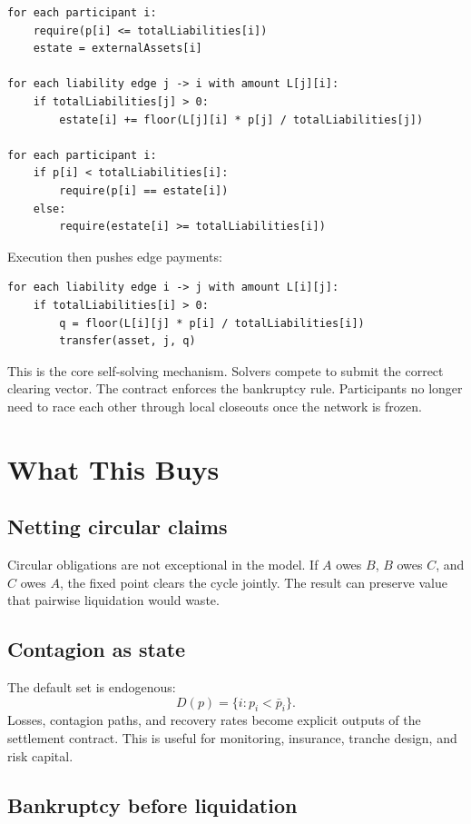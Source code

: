 \documentclass[11pt,oneside]{article}
\newcommand{\barp}{\bar p}
\begin{document}
\begin{verbatim}
for each participant i:
    require(p[i] <= totalLiabilities[i])
    estate = externalAssets[i]

for each liability edge j -> i with amount L[j][i]:
    if totalLiabilities[j] > 0:
        estate[i] += floor(L[j][i] * p[j] / totalLiabilities[j])

for each participant i:
    if p[i] < totalLiabilities[i]:
        require(p[i] == estate[i])
    else:
        require(estate[i] >= totalLiabilities[i])
\end{verbatim}

Execution then pushes edge payments:

\begin{verbatim}
for each liability edge i -> j with amount L[i][j]:
    if totalLiabilities[i] > 0:
        q = floor(L[i][j] * p[i] / totalLiabilities[i])
        transfer(asset, j, q)
\end{verbatim}

This is the core self-solving mechanism. Solvers compete to submit the correct
clearing vector. The contract enforces the bankruptcy rule. Participants no
longer need to race each other through local closeouts once the network is
frozen.

\section{What This Buys}

\subsection{Netting circular claims}

Circular obligations are not exceptional in the model. If $A$ owes $B$, $B$
owes $C$, and $C$ owes $A$, the fixed point clears the cycle jointly. The result
can preserve value that pairwise liquidation would waste.

\subsection{Contagion as state}

The default set is endogenous:
\[
  D(p)=\{i: p_i<\barp_i\}.
\]
Losses, contagion paths, and recovery rates become explicit outputs of the
settlement contract. This is useful for monitoring, insurance, tranche design,
and risk capital.

\subsection{Bankruptcy before liquidation}
\end{document}
